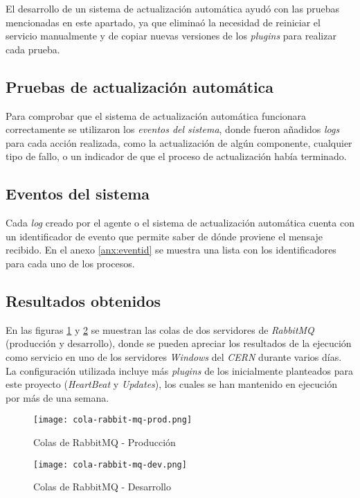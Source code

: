         El desarrollo de un sistema de actualización automática ayudó con las pruebas mencionadas en este apartado, ya que eliminaó la necesidad de reiniciar el servicio manualmente y de copiar nuevas versiones de los \textit{plugins} para realizar cada prueba.
    
    \subsection{Pruebas de actualización automática}
        Para comprobar que el sistema de actualización automática funcionara correctamente se utilizaron los \textit{eventos del sistema}, donde fueron añadidos \textit{logs} para cada acción realizada, como la actualización de algún componente, cualquier tipo de fallo, o un indicador de que el proceso de actualización había terminado.
        
    \subsection{Eventos del sistema}
        Cada \textit{log} creado por el agente o el sistema de actualización automática cuenta con un identificador de evento que permite saber de dónde proviene el mensaje recibido. En el anexo \ref{anx:eventid} se muestra una lista con los identificadores para cada uno de los procesos.
        
    \subsection{Resultados obtenidos}
        En las figuras \ref{fig:rabbitmq-prod-queue} y \ref{fig:rabbitmq-dev-queue} se muestran las colas de dos servidores de \textit{RabbitMQ} (producción y desarrollo), donde se pueden apreciar los resultados de la ejecución como servicio en uno de los servidores \textit{Windows} del \textit{CERN} durante varios días. La configuración utilizada incluye más \textit{plugins} de los inicialmente planteados para este proyecto (\textit{HeartBeat} y \textit{Updates}), los cuales se han mantenido en ejecución por más de una semana.
        
        \begin{figure}[h!]
        \centering
            \texttt{[image: cola-rabbit-mq-prod.png]}
            \caption{Colas de RabbitMQ - Producción}
            \label{fig:rabbitmq-prod-queue}
        \end{figure}
    
        \begin{figure}[h!]
        \centering
            \texttt{[image: cola-rabbit-mq-dev.png]}
            \caption{Colas de RabbitMQ - Desarrollo}
            \label{fig:rabbitmq-dev-queue}
        \end{figure}
        
